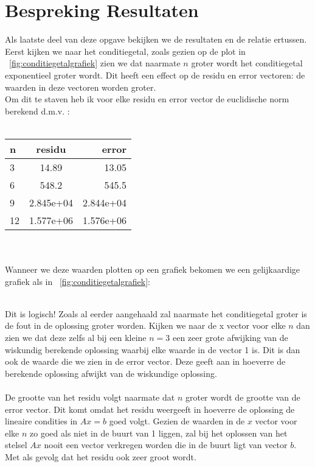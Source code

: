 \documentclass[10pt,a4paper,twocolumn]{article}
\begin{document}
\section{Bespreking Resultaten}
Als laatste deel van deze opgave bekijken we de resultaten en de relatie ertussen. Eerst kijken we naar het conditiegetal, zoals gezien op de plot in ~\ref{fig:conditiegetalgrafiek} zien we dat naarmate $n$ groter wordt het conditiegetal exponentieel groter wordt. Dit heeft een effect op de residu en error vectoren: de waarden in deze vectoren worden groter.
\\
Om dit te staven heb ik voor elke residu en error vector de euclidische norm berekend d.m.v. \texttt{}:
\\
\\
 \begin{tabular}{ l | c | r }
   \textbf{n} & \textbf{residu} & \textbf{error} \\ \hline
   3 & 14.89 & 13.05 \\
   6 & 548.2 & 545.5 \\
   9 & 2.845e+04 & 2.844e+04 \\
   12 & 1.577e+06 & 1.576e+06 \\
\end{tabular}
\\
\\
Wanneer we deze waarden plotten op een grafiek bekomen we een gelijkaardige grafiek als in ~\ref{fig:conditiegetalgrafiek}:
\\
Dit is logisch! Zoals al eerder aangehaald zal naarmate het conditiegetal groter is de fout in de oplossing groter worden. Kijken we naar de x vector voor elke $n$ dan zien we dat deze zelfs al bij een kleine $n = 3$ een zeer grote afwijking van de wiskundig berekende oplossing waarbij elke waarde in de vector 1 is. Dit is dan ook de waarde die we zien in de error vector. Deze geeft aan in hoeverre de berekende oplossing afwijkt van de wiskundige oplossing. 
\\
\\
De grootte van het residu volgt naarmate dat $n$ groter wordt de grootte van de error vector. Dit komt omdat het residu weergeeft in hoeverre de oplossing de lineaire condities in $Ax = b$ goed volgt. Gezien de waarden in de $x$ vector voor elke $n$ zo goed als niet in de buurt van 1 liggen, zal bij het oplossen van het stelsel $Ax$ nooit een vector verkregen worden die in de buurt ligt van vector $b$. Met als gevolg dat het residu ook zeer groot wordt.
\end{document}

